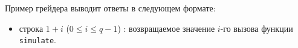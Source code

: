 Пример грейдера выводит ответы в следующем формате:
\begin{itemize}
\item строка $1 + i$ ($0 \leq i \leq q - 1$) : возвращаемое значение $i$-го вызова функции \texttt{simulate}.
\end{itemize}